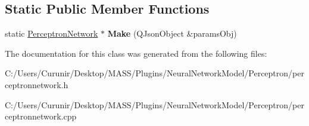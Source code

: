 \subsection*{Static Public Member Functions}
\begin{DoxyCompactItemize}
\item 
\mbox{\label{class_perceptron_network_a9acf3e33492a4163df20f6877a6f3db7}} 
static \hyperlink{class_perceptron_network}{Perceptron\+Network} $\ast$ {\bfseries Make} (Q\+Json\+Object \&params\+Obj)
\end{DoxyCompactItemize}


The documentation for this class was generated from the following files\+:\begin{DoxyCompactItemize}
\item 
C\+:/\+Users/\+Curunir/\+Desktop/\+M\+A\+S\+S/\+Plugins/\+Neural\+Network\+Model/\+Perceptron/perceptronnetwork.\+h\item 
C\+:/\+Users/\+Curunir/\+Desktop/\+M\+A\+S\+S/\+Plugins/\+Neural\+Network\+Model/\+Perceptron/perceptronnetwork.\+cpp\end{DoxyCompactItemize}
